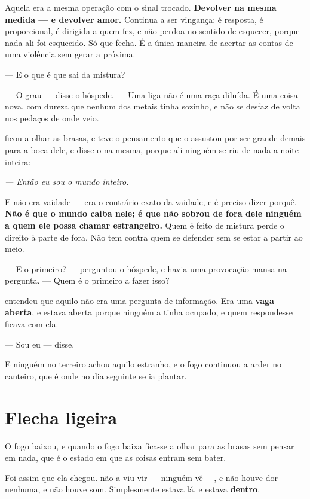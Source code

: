 \documentclass[livro.tex]{subfiles}
\begin{document}
\medskip
\noindent Aquela era a mesma operação com o sinal trocado. \textbf{Devolver na
mesma medida --- e devolver amor.} Continua a ser vingança: é resposta, é
proporcional, é dirigida a quem fez, e não perdoa no sentido de esquecer, porque
nada ali foi esquecido. Só que fecha. É a única maneira de acertar as contas de
uma violência sem gerar a próxima.

\medskip
\noindent --- E o que é que sai da mistura?

--- O grau --- disse o hóspede. --- Uma liga não é uma raça diluída. É uma coisa
nova, com dureza que nenhum dos metais tinha sozinho, e não se desfaz de volta
nos pedaços de onde veio.

\medskip
\noindent \Ben ficou a olhar as brasas, e teve o pensamento que o assustou por
ser grande demais para a boca dele, e disse-o na mesma, porque ali ninguém se
riu de nada a noite inteira:

\begin{center}
\emph{--- Então eu sou o mundo inteiro.}
\end{center}

\noindent E não era vaidade --- era o contrário exato da vaidade, e é preciso
dizer porquê. \textbf{Não é que o mundo caiba nele; é que não sobrou de fora
dele ninguém a quem ele possa chamar estrangeiro.} Quem é feito de mistura
perde o direito à parte de fora. Não tem contra quem se defender sem se estar a
partir ao meio.

\medskip
\noindent --- E o primeiro? --- perguntou o hóspede, e havia uma provocação
mansa na pergunta. --- Quem é o primeiro a fazer isso?

\medskip
\noindent \Ben entendeu que aquilo não era uma pergunta de informação. Era uma
\textbf{vaga aberta}, e estava aberta porque ninguém a tinha ocupado, e quem
respondesse ficava com ela.

\medskip
\noindent --- Sou eu --- disse.

E ninguém no terreiro achou aquilo estranho, e o fogo continuou a arder no
canteiro, que é onde no dia seguinte se ia plantar.

\chapter{Flecha ligeira}

O fogo baixou, e quando o fogo baixa fica-se a olhar para as brasas sem
pensar em nada, que é o estado em que as coisas entram sem bater.

Foi assim que ela chegou. \Ben não a viu vir --- ninguém vê ---, e não houve
dor nenhuma, e não houve som. Simplesmente estava lá, e estava \textbf{dentro}.
\end{document}
